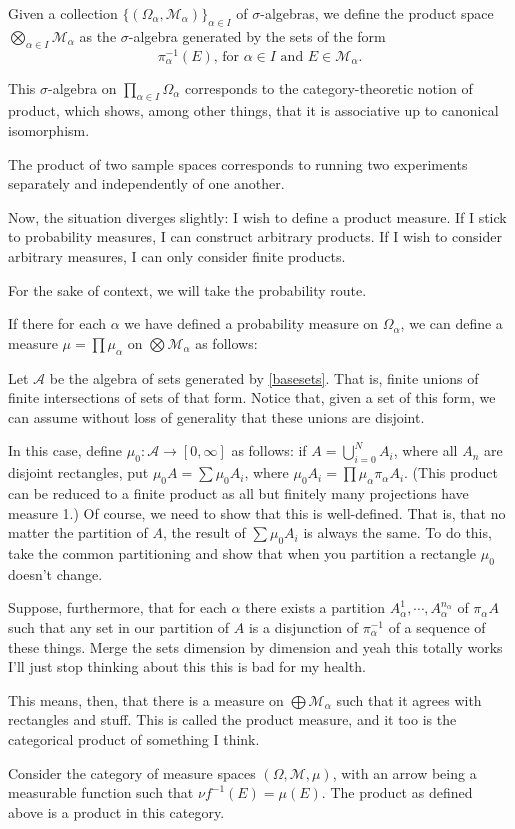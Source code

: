 \documentclass{article}
\theoremstyle{definition}
\newcommand{\M}{\mathcal{M}}
\newcommand{\A}{\mathcal{A}}
\begin{document}
	Given a collection $\{(\Omega_\alpha, \M_\alpha)\}_{\alpha \in I}$ of $\sigma$-algebras, we define the product space $\bigotimes_{\alpha\in I} \M_\alpha$ as the $\sigma$-algebra generated by the sets of the form
	\begin{equation}\label{basesets}
	\pi_\alpha^{-1}(E)\text{, for $\alpha \in I$ and $E \in \M_\alpha$}.
	\end{equation}
	
	This $\sigma$-algebra on $\prod_{\alpha \in I} \Omega_\alpha$ corresponds to the category-theoretic notion of product, which shows, among other things, that it is associative up to canonical isomorphism.
	
	The product of two sample spaces corresponds to running two experiments separately and independently of one another.
	
	Now, the situation diverges slightly: I wish to define a product measure. If I stick to probability measures, I can construct arbitrary products. If I wish to consider arbitrary measures, I can only consider finite products.
	
	For the sake of context, we will take the probability route.
	
	If there for each $\alpha$ we have defined a probability measure on $\Omega_\alpha$, we can define a measure $\mu = \prod \mu_\alpha$ on $\bigotimes \M_\alpha$ as follows:
	
	Let $\A$ be the algebra of sets generated by \eqref{basesets}. That is, finite unions of finite intersections of sets of that form. Notice that, given a set of this form, we can assume without loss of generality that these unions are disjoint.
	
	In this case, define $\mu_0 : \A \to \left[0, \infty\right]$ as follows: if $A = \bigcup_{i = 0}^N A_i$, where all $A_n$ are disjoint rectangles, put $\mu_0 A = \sum \mu_0 A_i$, where $\mu_0 A_i = \prod \mu_\alpha \pi_\alpha A_i$. (This product can be reduced to a finite product as all but finitely many projections have measure 1.) Of course, we need to show that this is well-defined. That is, that no matter the partition of $A$, the result of $\sum \mu_0 A_i$ is always the same. To do this, take the common partitioning and show that when you partition a rectangle $\mu_0$ doesn't change.
	
	Suppose, furthermore, that for each $\alpha$ there exists a partition $A_\alpha^1, \cdots, A_\alpha^{n_\alpha}$ of $\pi_\alpha A$ such that any set in our partition of $A$ is a disjunction of $\pi_\alpha^{-1}$ of a sequence of these things. Merge the sets dimension by dimension and yeah this totally works I'll just stop thinking about this this is bad for my health.
	
	This means, then, that there is a measure on $\bigoplus \M_\alpha$ such that it agrees with rectangles and stuff. This is called the product measure, and it too is the categorical product of something I think.
	
	Consider the category of measure spaces $(\Omega, \M, \mu)$, with an arrow being a measurable function such that $\nu f^{-1} (E) = \mu(E)$. The product as defined above is a product in this category.
\end{document}

